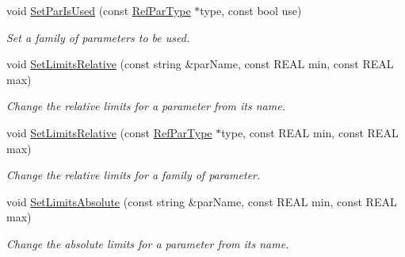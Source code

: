 \begin{DoxyCompactItemize}
\mbox{\label{class_obj_cryst_1_1_optimization_obj_a73c29f094ad0a4923a2873388fc1eb93}} 
void \mbox{\hyperlink{class_obj_cryst_1_1_optimization_obj_a73c29f094ad0a4923a2873388fc1eb93}{Set\+Par\+Is\+Used}} (const \mbox{\hyperlink{class_obj_cryst_1_1_ref_par_type}{Ref\+Par\+Type}} $\ast$type, const bool use)
\begin{DoxyCompactList}\small\item\em Set a family of parameters to be used. \end{DoxyCompactList}\item 
\mbox{\label{class_obj_cryst_1_1_optimization_obj_a78113a7741eeda2263a27adcc24497c0}} 
void \mbox{\hyperlink{class_obj_cryst_1_1_optimization_obj_a78113a7741eeda2263a27adcc24497c0}{Set\+Limits\+Relative}} (const string \&par\+Name, const R\+E\+AL min, const R\+E\+AL max)
\begin{DoxyCompactList}\small\item\em Change the relative limits for a parameter from its name. \end{DoxyCompactList}\item 
\mbox{\label{class_obj_cryst_1_1_optimization_obj_a0437fb441bebe91879de98efcb82865e}} 
void \mbox{\hyperlink{class_obj_cryst_1_1_optimization_obj_a0437fb441bebe91879de98efcb82865e}{Set\+Limits\+Relative}} (const \mbox{\hyperlink{class_obj_cryst_1_1_ref_par_type}{Ref\+Par\+Type}} $\ast$type, const R\+E\+AL min, const R\+E\+AL max)
\begin{DoxyCompactList}\small\item\em Change the relative limits for a family of parameter. \end{DoxyCompactList}\item 
\mbox{\label{class_obj_cryst_1_1_optimization_obj_ad0bc0b36d1525526c55dc6642109d0b4}} 
void \mbox{\hyperlink{class_obj_cryst_1_1_optimization_obj_ad0bc0b36d1525526c55dc6642109d0b4}{Set\+Limits\+Absolute}} (const string \&par\+Name, const R\+E\+AL min, const R\+E\+AL max)
\begin{DoxyCompactList}\small\item\em Change the absolute limits for a parameter from its name. \end{DoxyCompactList}\item 

\end{DoxyCompactItemize}
